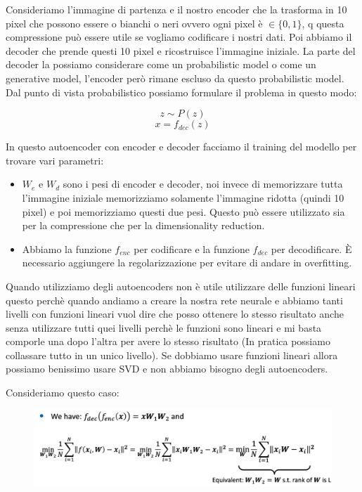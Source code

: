 \documentclass[14pt]{extreport}
\begin{document}
Consideriamo l'immagine di partenza e il nostro encoder che la trasforma in 10 pixel che possono essere o bianchi o neri ovvero ogni pixel è $\in \{0,1\}$, q
questa compressione può essere utile se vogliamo codificare i nostri dati.
Poi abbiamo il decoder che prende questi 10 pixel e ricostruisce l'immagine iniziale.
La parte del decoder la possiamo considerare come un probabilistic model o come un generative model, l'encoder però rimane escluso da questo probabilistic model.
Dal punto di vista probabilistico possiamo formulare il problema in questo modo:

$$z \sim P(z)$$
$$x = f_{dec}(z)$$

In questo autoencoder con encoder e decoder facciamo il training del modello per trovare vari parametri:
\begin{itemize}
\item $W_e$ e $W_d$ sono i pesi di encoder e decoder, noi invece di memorizzare tutta l'immagine iniziale memorizziamo solamente l'immagine ridotta (quindi 10 pixel)
e poi memorizziamo questi due pesi. Questo può essere utilizzato sia per la compressione che per la dimensionality reduction.
\item Abbiamo la funzione $f_{enc}$ per codificare e la funzione $f_{dec}$ per decodificare. È necessario aggiungere la regolarizzazione per evitare di andare in
overfitting.
\end{itemize}

Quando utilizziamo degli autoencoders non è utile utilizzare delle funzioni lineari questo perchè quando andiamo a creare la nostra rete neurale e abbiamo tanti 
livelli con funzioni lineari vuol dire che posso ottenere lo stesso risultato anche senza utilizzare tutti quei livelli perchè le funzioni sono lineari e mi basta
comporle una dopo l'altra per avere lo stesso risultato (In pratica possiamo collassare tutto in un unico livello).
Se dobbiamo usare funzioni lineari allora possiamo benissimo usare SVD e non abbiamo bisogno degli autoencoders.

Consideriamo questo caso:


\begin{figure}[H] 
\centering
\includegraphics[width=0.7\linewidth]{536.jpeg}
\end{figure}
\end{document}
